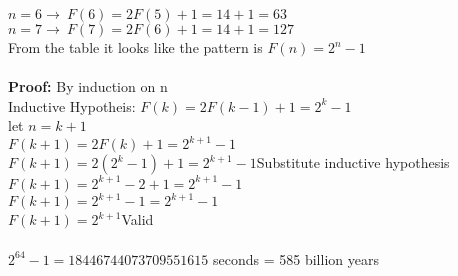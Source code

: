 \documentclass[11pt,letterpaper]{article}
\begin{document}
\begin{enumerate}[(a)]
$n=6\rightarrow~F(6) = 2F(5) + 1 = 14+1=63$\\
$n=7\rightarrow~F(7) = 2F(6) + 1 = 14+1=127$\\
From the table it looks like the pattern is $F(n) = 2^n -1$\\\\
\textbf{Proof:} By induction on n\\ 
Inductive Hypotheis: $F(k) = 2F(k-1) + 1 = 2^k -1$\\
let $n=k+1$\\
$F(k+1) = 2F(k) + 1 = 2^{k+1} -1$\\
$F(k+1) = 2(2^k -1) + 1 = 2^{k+1} -1$\hfill Substitute inductive hypothesis\\
$F(k+1) = 2^{k+1} -2 + 1 = 2^{k+1} -1$\\
$F(k+1) = 2^{k+1} -1 = 2^{k+1} -1$\\
$F(k+1) = 2^{k+1}$\hfill Valid\\
\\
$2^{64}-1=18446744073709551615$ seconds = 585 billion years
\end{enumerate}
\end{document}
